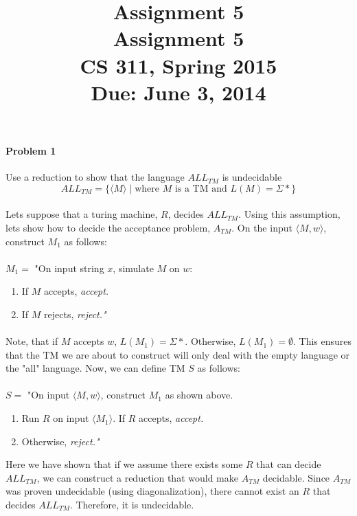 \documentclass{article}
\title{\vspace{-3ex} \bf Assignment 5 \\[1ex]}
\title{\vspace{-3ex} \bf Assignment 5 \\[1ex]\rm\normalsize CS 311, Spring 2015 \\ Due: June 3, 2014}
\date{}
\author{}
\begin{document}
\maketitle
\paragraph{Problem 1} Use a reduction to show that the language $ALL_{TM}$ is undecidable
\[ALL_{TM} = \{ \langle M \rangle \;|\; \mbox{where $M$ is a TM and $L(M) = \Sigma*$} \}\]

\paragraph{} Lets suppose that a turing machine, $R$, decides $ALL_{TM}$. Using this assumption, lets show how to decide the acceptance problem, $A_{TM}$.  On the input $\langle M,w\rangle$, construct $M_1$ as follows:
\\\\
\noindent $M_1 = $ "On input string $x$, simulate $M$ on $w$: 
    \begin{enumerate}[\indent 1.]
    \item If $M$ accepts, \em accept.\em
    \item If $M$ rejects, \em reject."
    \end{enumerate}
\paragraph{} Note, that if $M$ accepts $w$, $L(M_1) = \Sigma*$. Otherwise, $L(M_1) = \emptyset$. This ensures that the TM we are about to construct will only deal with the empty language or the "all" language. Now, we can define TM $S$ as follows:
\\\\
\noindent $S = $ "On input $\langle M,w\rangle$, construct $M_1$ as shown above.
	\begin{enumerate}[\indent 1.]
	\item Run $R$ on input $\langle M_1\rangle$. If $R$ accepts, \em accept.\em
	\item Otherwise, \em reject."\em\\
	\end{enumerate}
\noindent Here we have shown that if we assume there exists some $R$ that can decide $ALL_{TM}$, we can construct a reduction that would make $A_{TM}$ decidable. Since $A_{TM}$ was proven undecidable (using diagonalization), there cannot exist an $R$ that decides $ALL_{TM}$. Therefore, it is undecidable.
\end{document}
